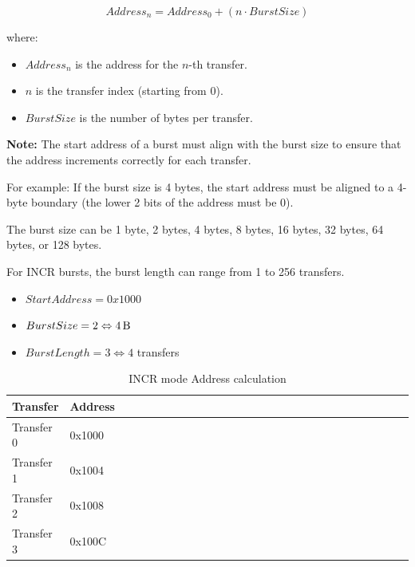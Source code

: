 $$Address_n = Address_0 + (n \cdot BurstSize)$$

where:
\begin{itemize}
    \item $Address_n$ is the address for the $n$-th transfer.
    \item $n$ is the transfer index (starting from 0).
    \item $BurstSize$ is the number of bytes per transfer.
\end{itemize}

\textbf{Note:} The start address of a burst must align with the burst size to ensure that the address increments correctly for each transfer.

For example: If the burst size is 4 bytes, the start address must be aligned to a 4-byte boundary (the lower 2 bits of the address must be 0).

\subtitle{Burst Size}

The burst size can be 1 byte, 2 bytes, 4 bytes, 8 bytes, 16 bytes, 32 bytes, 64 bytes, or 128 bytes.

\subtitle{Burst Length}
For INCR bursts, the burst length can range from 1 to 256 transfers.

\subtitle{Example}

\begin{multicols}{2}
\begin{itemize}
    \item $StartAddress = 0x1000$
    \item $BurstSize = 2 \Leftrightarrow \SI{4}{\byte}$ 
    \item $BurstLength = 3 \Leftrightarrow 4$ transfers
\end{itemize}

\begin{table}[H]
\begin{threeparttable}
\caption{INCR mode Address calculation}
\begin{tabularx}{\linewidth}{wm{0.5\linewidth} | wm{0.5\linewidth}}
\hline
\textbf{Transfer}   & \textbf{Address} \\ 
\hline        
Transfer 0 & 0x1000 \\
Transfer 1 & 0x1004 \\
Transfer 2 & 0x1008 \\
Transfer 3 & 0x100C \\
\hline
\end{tabularx}
\end{threeparttable}
\end{table}
\end{multicols}

